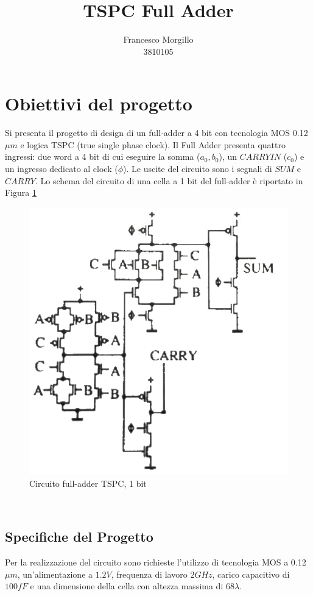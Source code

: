 \documentclass[11pt]{article} %
\title{TSPC  Full Adder}
\author{Francesco Morgillo\\3810105}
\begin{document}
\maketitle

\section{Obiettivi del progetto }
Si presenta il progetto di design di un full-adder a 4 bit con tecnologia MOS 0.12 $\mu m$ e logica TSPC (true single phase clock). 
Il Full Adder presenta quattro ingressi: due word a 4 bit di cui eseguire la somma ($a_{0},b_{0}$), un $CARRY IN$ ($ c_{0}$) e un ingresso dedicato al clock ($\phi$).
Le uscite del circuito sono i segnali di $SUM$ e $CARRY$.
Lo schema del circuito di una cella a 1 bit del full-adder è riportato in Figura \ref{fig:Schematic}
\begin{figure}[h!]
  \includegraphics[scale=0.75]{Schematic.png}
  \caption{Circuito full-adder TSPC, 1 bit}
  \label{fig:Schematic}
\end{figure}

\

\subsection{Specifiche del Progetto}
Per la realizzazione del circuito sono richieste l'utilizzo di tecnologia MOS a 0.12 $\mu m$, un'alimentazione a $1.2V$, frequenza di lavoro $2GHz$,  carico capacitivo di $100fF$ e una dimensione della cella con altezza massima di 68$\lambda$.
\end{document}
